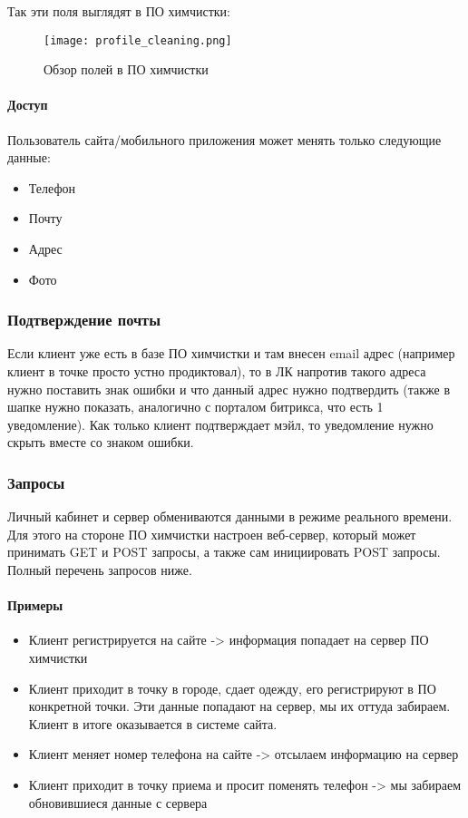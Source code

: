 \documentclass[DIV=calc, paper=a4, fontsize=11pt]{scrartcl} %
\begin{document}
Так эти поля выглядят в ПО химчистки:

	\begin{figure}[H]
        \centering
        \texttt{[image: profile\_cleaning.png]}
        \caption{Обзор полей в ПО химчистки\label{fig:profile_cleaning.png}}
    \end{figure}
    
\paragraph{Доступ}
Пользователь сайта/мобильного приложения может менять только следующие данные:

\begin{itemize}
	\item Телефон
	\item Почту
	\item Адрес
	\item Фото
\end{itemize}

\subsubsection{Подтверждение почты}
Если клиент уже есть в базе ПО химчистки и там внесен email адрес (например клиент в точке просто устно продиктовал), то в ЛК напротив такого адреса нужно поставить знак ошибки и что данный адрес нужно подтвердить (также в шапке нужно показать, аналогично с порталом битрикса, что есть 1 уведомление). Как только клиент подтверждает мэйл, то уведомление нужно скрыть вместе со знаком ошибки.

\subsubsection{Запросы}
Личный кабинет и сервер обмениваются данными в режиме реального времени. Для этого на стороне ПО химчистки настроен веб-сервер, который может принимать GET и POST запросы, а также сам инициировать POST запросы. Полный перечень запросов ниже.

\paragraph{Примеры}
\begin{itemize}
	\item Клиент регистрируется на сайте -> информация попадает на сервер ПО химчистки
	\item Клиент приходит в точку в городе, сдает одежду, его регистрируют в ПО конкретной точки. Эти данные попадают на сервер, мы их оттуда забираем. Клиент в итоге оказывается в системе сайта.
	\item Клиент меняет номер телефона на сайте -> отсылаем информацию на сервер
	\item Клиент приходит в точку приема и просит поменять телефон -> мы забираем обновившиеся данные с сервера
\end{itemize}
\end{document}
